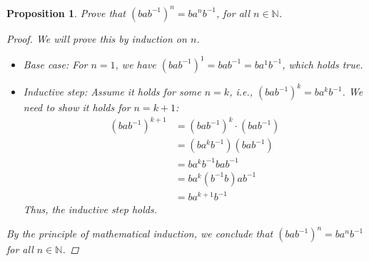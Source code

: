 \documentclass[12pt]{article}
\newcommand{\N}{\mathbb{N}} %
\newtheorem{proposition}{Proposition}
\begin{document}
\begin{proposition}
  Prove that $(bab^{-1})^n = ba^nb^{-1}$, for all $n \in \N$.
  \begin{proof}
    We will prove this by induction on $n$.
    \begin{itemize}
      \item Base case: For $n = 1$, we have $(bab^{-1})^1 = bab^{-1} = ba^1b^{-1}$, which holds true.
      \item Inductive step: Assume it holds for some $n = k$, i.e., $(bab^{-1})^k = ba^kb^{-1}$.
            We need to show it holds for $n = k + 1$:
            \begin{align*}
              (bab^{-1})^{k+1} & = (bab^{-1})^k \cdot (bab^{-1}) \\
                               & = (ba^kb^{-1})(bab^{-1})        \\
                               & = ba^kb^{-1}bab^{-1}            \\
                               & = ba^k(b^{-1}b)ab^{-1}          \\
                               & = ba^{k+1}b^{-1}
            \end{align*}
            Thus, the inductive step holds.
    \end{itemize}
    By the principle of mathematical induction, we conclude that $(bab^{-1})^n = ba^nb^{-1}$ for all $n \in \N$.
  \end{proof}
\end{proposition}
\end{document}
